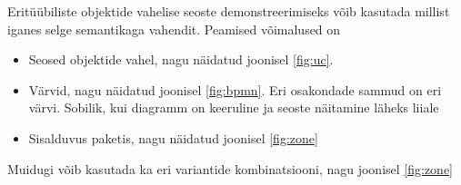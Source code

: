 \documentclass[nobib]{tufte-handout}
\begin{document}
Eritüübiliste objektide vahelise seoste demonstreerimiseks võib kasutada millist iganes selge semantikaga vahendit. Peamised võimalused on
\begin{itemize}
	\item Seosed objektide vahel, nagu näidatud joonisel \ref{fig:uc}. 
	\item Värvid, nagu näidatud joonisel \ref{fig:bpmn}. Eri osakondade sammud on eri värvi. Sobilik, kui diagramm on keeruline ja seoste näitamine läheks liiale
	\item Sisalduvus paketis, nagu näidatud joonisel \ref{fig:zone}
\end{itemize}

Muidugi võib kasutada ka eri variantide kombinatsiooni, nagu joonisel \ref{fig:zone}





\end{document}
